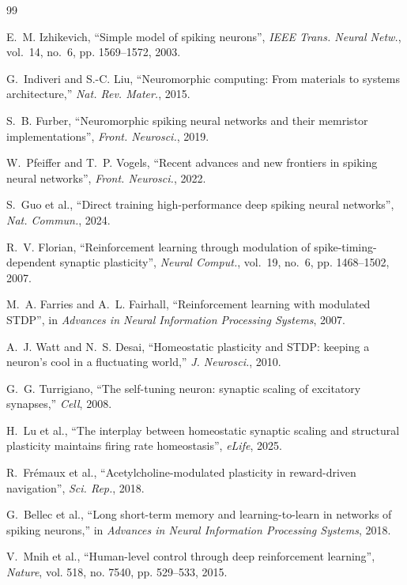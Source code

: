 \documentclass[journal]{IEEEtran}
\begin{document}
\begin{thebibliography}{99}

E.~M. Izhikevich, ``Simple model of spiking neurons”, \emph{IEEE Trans. Neural Netw.}, vol.~14, no.~6, pp. 1569--1572, 2003.

G.~Indiveri and S.-C. Liu, ``Neuromorphic computing: From materials to systems architecture,'' \emph{Nat. Rev. Mater.}, 2015.

S.~B. Furber, ``Neuromorphic spiking neural networks and their memristor implementations”, \emph{Front. Neurosci.}, 2019.

W.~Pfeiffer and T.~P. Vogels, ``Recent advances and new frontiers in spiking neural networks”, \emph{Front. Neurosci.}, 2022.

S.~Guo et al., ``Direct training high-performance deep spiking neural networks”, \emph{Nat. Commun.}, 2024.

R.~V. Florian, ``Reinforcement learning through modulation of spike-timing-dependent synaptic plasticity”, \emph{Neural Comput.}, vol.~19, no.~6, pp. 1468--1502, 2007.

M.~A. Farries and A.~L. Fairhall, ``Reinforcement learning with modulated STDP”, in \emph{Advances in Neural Information Processing Systems}, 2007.

A.~J. Watt and N.~S. Desai, ``Homeostatic plasticity and STDP: keeping a neuron’s cool in a fluctuating world,'' \emph{J. Neurosci.}, 2010.

G.~G. Turrigiano, ``The self-tuning neuron: synaptic scaling of excitatory synapses,'' \emph{Cell}, 2008.

H.~Lu et al., ``The interplay between homeostatic synaptic scaling and structural plasticity maintains firing rate homeostasis”, \emph{eLife}, 2025.

R.~Frémaux et al., ``Acetylcholine-modulated plasticity in reward-driven navigation”, \emph{Sci. Rep.}, 2018.

G.~Bellec et al., ``Long short-term memory and learning-to-learn in networks of spiking neurons,'' in \emph{Advances in Neural Information Processing Systems}, 2018.

V.~Mnih et al., ``Human-level control through deep reinforcement learning”, \emph{Nature}, vol. 518, no. 7540, pp. 529--533, 2015.


\end{thebibliography}
\end{document}
